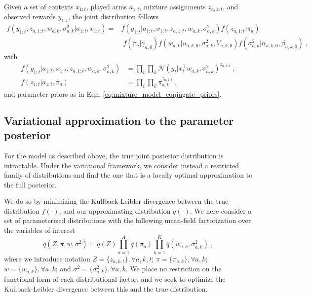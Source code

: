 \documentclass[10pt]{article}
\newcommand{\N}{\mathcal{N}}
\begin{document}
Given a set of contexts $x_{1:t}$, played arms $a_{1:t}$, mixture assignments $z_{a,1:t}$, and observed rewards $y_{1:t}$, the joint distribution follows
\begin{equation}
\begin{split}
f(y_{1:t}, z_{a,1:t}, w_{a,k}, \sigma_{a,k}^2|a_{1:t}, x_{1:t}) = & f(y_{1:t}|a_{1:t}, x_{1:t}, z_{a,1:t}, w_{a,k}, \sigma_{a,k}^2) f(z_{a,1:t}|\pi_{a}) \\
& \; f(\pi_{a}|\gamma_{a,0}) f(w_{a,k} |u_{a,k,0},\sigma_{a,k}^2, V_{a,k,0}) f(\sigma_{a,k}^2|\alpha_{a,k,0}, \beta_{a,k,0})\;,
\end{split}
\end{equation}
with 
\begin{equation}
\begin{split}
f(y_{1:t}|a_{1:t}, x_{1:t}, z_{a,1:t}, w_{a,k}, \sigma_{a,k}^2) &= \prod_{t} \prod_k \N(y_t|x_t^\top w_{a,k}, \sigma_{a,k}^2)^{z_{a,k,t}} \;,\\
f(z_{1:t}|a_{1:t},\pi_a) &= \prod_t \prod_k \pi_{a,k}^{z_{a,k,t}} \;,
\end{split}
\end{equation}
and parameter priors as in Eqn. \ref{eq:mixture_model_conjugate_priors}.

\subsection{Variational approximation to the parameter posterior}
\label{ssec:variational_distribution}

For the model as described above, the true joint posterior distribution is intractable. Under the variational framework, we consider instead a restricted family of distributions and find the one that is a locally optimal approximation to the full posterior.

We do so by minimizing the Kullback-Leibler divergence between the true distribution $f(\cdot)$, and our approximating distribution $q(\cdot)$. We here consider a set of parameterized distributions with the following mean-field factorization over the variables of interest
\begin{equation}
q(Z, \pi, w, \sigma^2)=q(Z) \prod_{a=1}^A q(\pi_a) \prod_{k=1}^{K} q(w_{a,k}, \sigma_{a,k}^2) \; ,
\label{eq:variational_factorization}
\end{equation}
where we introduce notation 
  $Z=\{z_{a,k,t}\}, \forall a,k,t$; 
  $\pi=\{\pi_{a,k}\}, \forall a,k$; 
  $w=\{w_{a,k}\}, \forall a,k$; 
  and 
  $\sigma^2=\{\sigma_{a,k}^2\}, \forall a,k$. 
We place no restriction on the functional form of each distributional factor, and we seek to optimize the Kullback-Leibler divergence between this and the true distribution.
\end{document}
